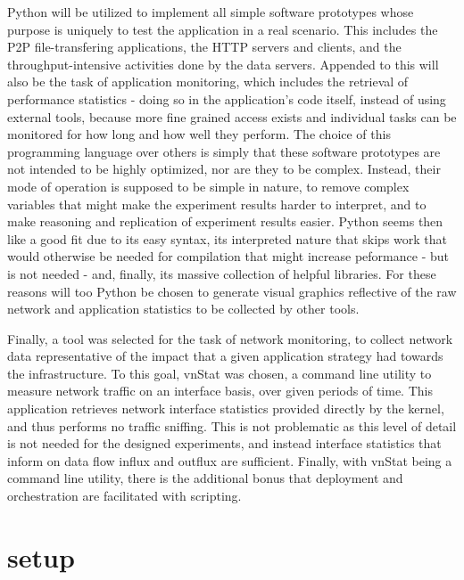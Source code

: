     Python \cite{python} will be utilized to implement all simple software prototypes whose purpose is uniquely to test the application in a real scenario.
    This includes the P2P file-transfering applications, the HTTP servers and clients, and the throughput-intensive activities done by the data servers.
    Appended to this will also be the task of application monitoring, which includes the retrieval of performance statistics - doing so in the application's code itself, instead of using external tools, because more fine grained access exists and individual tasks can be monitored for how long and how well they perform.
    The choice of this programming language over others is simply that these software prototypes are not intended to be highly optimized, nor are they to be complex.
    Instead, their mode of operation is supposed to be simple in nature, to remove complex variables that might make the experiment results harder to interpret, and to make reasoning and replication of experiment results easier. 
    Python seems then like a good fit due to its easy syntax, its interpreted nature that skips work that would otherwise be needed for compilation that might increase peformance - but is not needed - and, finally, its massive collection of helpful libraries.
    For these reasons will too Python be chosen to generate visual graphics reflective of the raw network and application statistics to be collected by other tools. 

    Finally, a tool was selected for the task of network monitoring, to collect network data representative of the impact that a given application strategy had towards the infrastructure.
    To this goal, vnStat \cite{vnstat} was chosen, a command line utility to measure network traffic on an interface basis, over given periods of time.
    This application retrieves network interface statistics provided directly by the kernel, and thus performs no traffic sniffing.
    This is not problematic as this level of detail is not needed for the designed experiments, and instead interface statistics that inform on data flow influx and outflux are sufficient. 
    Finally, with vnStat being a command line utility, there is the additional bonus that deployment and orchestration are facilitated with scripting. 

\section{setup}

